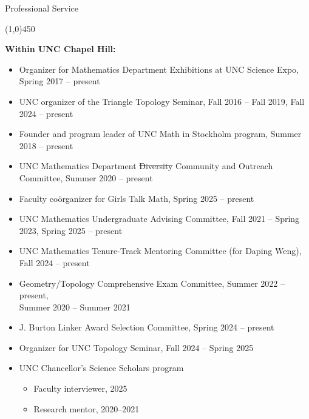 \documentclass[10pt]{article}
\begin{document}





\bigskip
\noindent
{\large \sc Professional Service}

\vspace{-0.1in}
\noindent
\line(1,0){450}
\smallskip

\noindent\textbf{Within UNC Chapel Hill:}

\begin{itemize}

\item Organizer for Mathematics Department Exhibitions at UNC Science Expo, Spring 2017 -- present

\item UNC organizer of the Triangle Topology Seminar, Fall 2016 -- Fall 2019, Fall 2024 -- present

\item Founder and program leader of UNC Math in Stockholm program, Summer 2018 -- present

\item UNC Mathematics Department \sout{Diversity} Community and Outreach Committee, Summer 2020 -- present

\item Faculty co\"{o}rganizer for Girls Talk Math, Spring 2025 -- present

\item UNC Mathematics Undergraduate Advising Committee, Fall 2021 -- Spring 2023, Spring 2025 -- present

\item UNC Mathematics Tenure-Track Mentoring Committee (for Daping Weng), 
Fall 2024 -- present

\item Geometry/Topology Comprehensive Exam Committee, 
Summer 2022 -- present, \\
Summer 2020 -- Summer 2021

\item J. Burton Linker Award Selection Committee, Spring 2024 -- present

\item Organizer for UNC Topology Seminar, Fall 2024 -- Spring 2025

\item UNC Chancellor's Science Scholars program
\begin{itemize}
\item Faculty interviewer, 2025
\item Research mentor, 2020--2021
\end{itemize}


\end{itemize}
\end{document}
